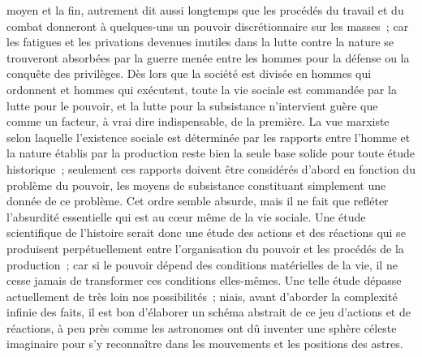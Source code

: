 \documentclass[french,twoside]{book} %
\begin{document}
moyen et la fin, autrement dit aussi longtemps que les procédés du travail et du combat donneront à quelques-uns un pouvoir discrétionnaire sur les masses ; car les fatigues et les privations devenues inutiles dans la lutte contre la nature se trouveront absorbées par la guerre menée entre les hommes pour la défense ou la conquête des privilèges. Dès lors que la société est divisée en hommes qui ordonnent et hommes qui exécutent, toute la vie sociale est commandée par la lutte pour le pouvoir, et la lutte pour la subsistance n'intervient guère que comme un facteur, à vrai dire indispensable, de la première. La vue marxiste selon laquelle l'existence sociale est déterminée par les rapports entre l'homme et la nature établis par la production reste bien la seule base solide pour toute étude historique ; seulement ces rapports doivent être considérés d'abord en fonction du problème du pouvoir, les moyens de subsistance constituant simplement une donnée de ce problème. Cet ordre semble absurde, mais il ne fait que refléter l'absurdité essentielle qui est au cœur même de la vie sociale. Une étude scientifique de l'histoire serait donc une étude des actions et des réactions qui se produisent perpétuellement entre l'organisation du pouvoir et les procédés de la production ; car si le pouvoir dépend des conditions matérielles de la vie, il ne cesse jamais de transformer ces conditions elles-mêmes. Une telle étude dépasse actuellement de très loin nos possibilités ; niais, avant d'aborder la complexité infinie des faits, il est bon d'élaborer un schéma abstrait de ce jeu d'actions et de réactions, à peu près comme les astronomes ont dû inventer une sphère céleste imaginaire pour s'y reconnaître dans les mouvements et les positions des astres.\par
\end{document}

